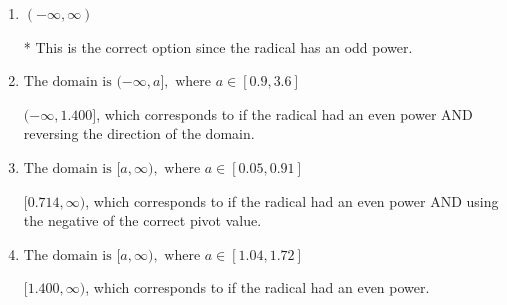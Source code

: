 \documentclass{extbook}[14pt]
\begin{document}
\begin{enumerate}
{\begin{enumerate}[label=\Alph*.]
$(-\infty, 0.714]$, which corresponds to if the radical had an even power AND reversing the direction of the domain AND using the negative of the correct pivot value.
\item \( (-\infty, \infty) \)

* This is the correct option since the radical has an odd power.
\item \( \text{The domain is } (-\infty, a], \text{   where } a \in [0.9, 3.6] \)

$(-\infty, 1.400]$, which corresponds to if the radical had an even power AND reversing the direction of the domain.
\item \( \text{The domain is } [a, \infty), \text{   where } a \in [0.05, 0.91] \)

$[0.714, \infty)$, which corresponds to if the radical had an even power AND using the negative of the correct pivot value.
\item \( \text{The domain is } [a, \infty), \text{   where } a \in [1.04, 1.72] \)

$[1.400, \infty)$, which corresponds to if the radical had an even power.
\end{enumerate}

}
\end{enumerate}
\end{document}
